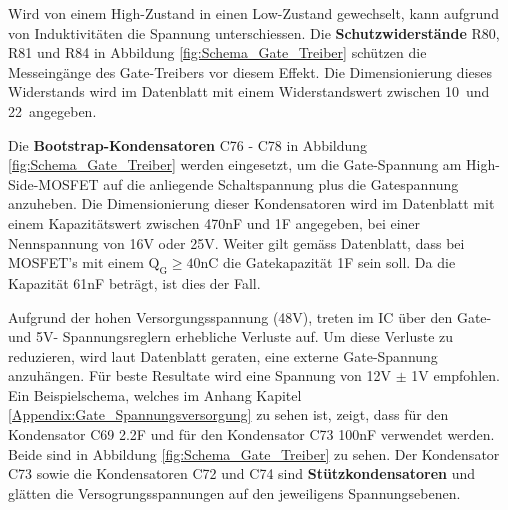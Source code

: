 Wird von einem High-Zustand in einen Low-Zustand gewechselt, kann aufgrund von Induktivitäten die Spannung unterschiessen. Die \textbf{Schutzwiderstände} R80, R81 und R84 in Abbildung \ref{fig:Schema_Gate_Treiber} schützen die Messeingänge des Gate-Treibers vor diesem Effekt.
Die Dimensionierung dieses Widerstands wird im Datenblatt mit einem Widerstandswert zwischen 10\textOmega\ und 22\textOmega\ angegeben.\cite[S.10]{trinamicmotion_control_gmbh__co_kg_tmc6200_2019}



Die \textbf{Bootstrap-Kondensatoren} C76 - C78 in Abbildung \ref{fig:Schema_Gate_Treiber} werden eingesetzt, um die Gate-Spannung am High-Side-MOSFET auf die anliegende Schaltspannung plus die Gatespannung anzuheben.
Die Dimensionierung dieser Kondensatoren wird im Datenblatt mit einem Kapazitätswert zwischen 470nF und 1\textmugreek F angegeben, bei einer Nennspannung von 16V oder 25V. Weiter gilt gemäss Datenblatt, dass bei MOSFET's mit einem $\mathrm{Q_G \geq 40nC}$ die Gatekapazität 1\textmugreek F sein soll. Da die Kapazität 61nF beträgt, ist dies der Fall. \cite[S.10]{trinamicmotion_control_gmbh__co_kg_tmc6200_2019}



Aufgrund der hohen Versorgungsspannung (48V), treten im IC über den Gate- und 5V- Spannungsreglern erhebliche Verluste auf. Um diese Verluste zu reduzieren, wird laut Datenblatt geraten, eine externe Gate-Spannung anzuhängen. Für beste Resultate wird eine Spannung von 12V $\pm$ 1V empfohlen.
Ein Beispielschema, welches im Anhang Kapitel \ref{Appendix:Gate_Spannungsversorgung} zu sehen ist, zeigt, dass für den Kondensator C69 2.2\textmugreek F und für den Kondensator C73 100nF verwendet werden. Beide sind in Abbildung \ref{fig:Schema_Gate_Treiber} zu sehen. Der Kondensator C73 sowie die Kondensatoren C72 und C74 sind \textbf{Stützkondensatoren} und glätten die Versogrungsspannungen auf den jeweiligens Spannungsebenen.

